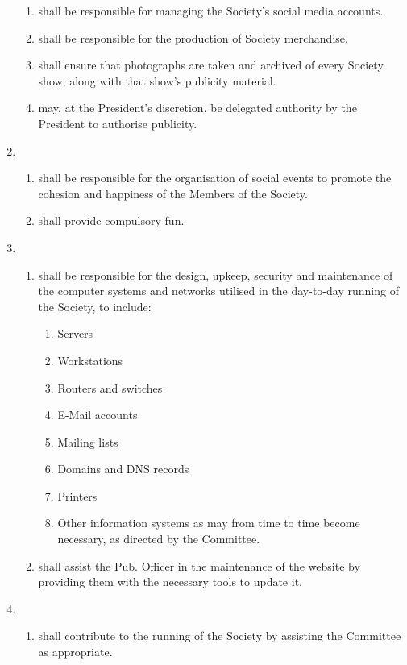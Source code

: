 \documentclass[a4paper]{tufte-handout}
\newcommand{\policyOffset}{12pt}
\newcommand{\policyPub}[2][\policyOffset]{\marginnote[#1]{\textsc{Publicity Policy \S#2}}}
\begin{document}
\begin{enumerate}[resume]
\begin{enumerate}
            \item shall be responsible for managing the Society's social media accounts.
            \item shall be responsible for the production of Society merchandise.
            \item shall ensure that photographs are taken and archived of every Society show, along with that show's publicity material.
            \item \policyPub{4} may, at the President's discretion, be delegated authority by the President to authorise publicity.
        \end{enumerate}
    \item {}
        \begin{enumerate}
            \item shall be responsible for the organisation of social events to promote the cohesion and happiness of the Members of the Society.
            \item shall provide compulsory fun.
        \end{enumerate}
    \item {}
        \begin{enumerate}
            \item shall be responsible for the design, upkeep, security and maintenance of the computer systems and networks utilised in the day-to-day running of the Society, to include:
                \begin{enumerate}
                    \item Servers
                    \item Workstations
                    \item Routers and switches
                    \item E-Mail accounts
                    \item Mailing lists
                    \item Domains and DNS records
                    \item Printers
                    \item Other information systems as may from time to time become necessary, as directed by the Committee.
                \end{enumerate}
            \item shall assist the Pub. Officer in the maintenance of the website by providing them with the necessary tools to update it.
        \end{enumerate}
    \item {}
        \begin{enumerate}
            \item shall contribute to the running of the Society by assisting the Committee as appropriate.
        \end{enumerate}
\end{enumerate}
\end{document}
